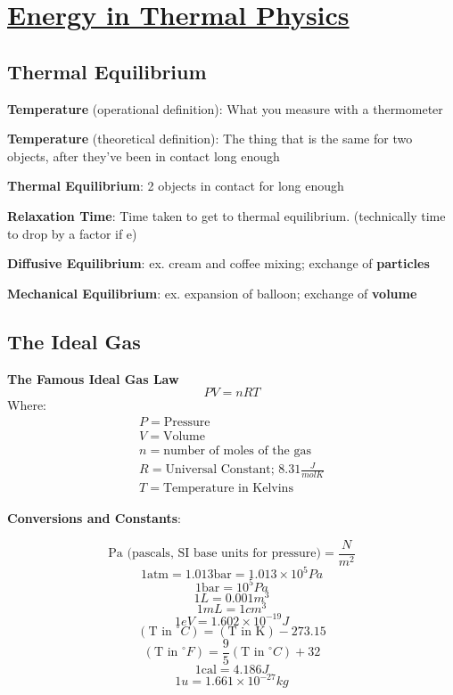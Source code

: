\def \secname {Energy in Thermal Physics}

\section[\secname]{\hyperlink{toc}{\secname}}



\subsection{Thermal Equilibrium}
\textbf{Temperature} (operational definition): What you measure with a thermometer

\textbf{Temperature} (theoretical definition): The thing that is the same for two objects, after they've been in contact long enough

\textbf{Thermal Equilibrium}: 2 objects in contact for long enough

\textbf{Relaxation Time}: Time taken to get to thermal equilibrium. (technically time to drop by a factor if e)

\textbf{Diffusive Equilibrium}: ex. cream and coffee mixing; exchange of \textbf{particles}

\textbf{Mechanical Equilibrium}: ex. expansion of balloon; exchange of \textbf{volume}

\subsection{The Ideal Gas}
\begin{shaded}
\textbf{The Famous Ideal Gas Law} \newline
\begin{equation}
PV = nRT
\end{equation}
Where:
\begin{equation*}
\begin{split}
P = \text{Pressure} \\
V = \text{Volume} \\
n = \text{number of moles of the gas}\\
R = \text{Universal Constant; 8.31}\frac{J}{mol K}\\
T = \text{Temperature in Kelvins}
\end{split}
\end{equation*}
\end{shaded}

\textbf{Conversions and Constants}:

\[\text{Pa (pascals, SI base units for pressure)} = \frac{N}{m^2}\]
\[1 \text{atm} = 1.013 \text{bar} = 1.013 \times 10^{5} Pa\]
\[1 \text{bar} = 10^5Pa\]
\[1 L = 0.001m^3\]
\[1 mL = 1cm^3\]
\[ 1eV = 1.602 \times 10^{-19}J\]
\[ (\text{T in }^\circ C) = (\text{T in K}) - 273.15\]
\[ (\text{T in }^\circ F) = \frac{9}{5}(\text{T in }^\circ C) +32\]
\[1 \text{cal} = 4.186J\]
\[1 u = 1.661 \times 10^{-27} kg\]

